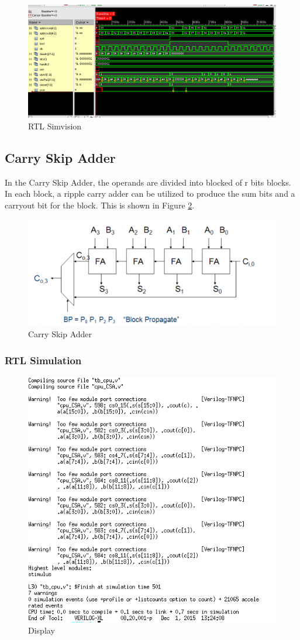 \documentclass[12pt]{article}
\begin{document}
\begin{figure}[H]
\centering
\includegraphics[width=\linewidth]{../CLA/test-test}
\caption{RTL Simvision}
\label{fig:test-test}
\end{figure}

\subsection{Carry Skip Adder}
In the Carry Skip Adder, the operands are divided into blocked of r bits blocks. In each block, a ripple carry adder can be utilized to produce the sum bits and a carryout bit for the block. This is shown in Figure \ref{fig:carry-skip}.

\begin{figure}[H]
\centering
\includegraphics[width=0.7\linewidth]{carry-skip}
\caption{Carry Skip Adder}
\label{fig:carry-skip}
\end{figure}

\subsubsection{RTL Simulation}
\begin{figure}[H]
	\centering
	\includegraphics[width=.7\linewidth]{../CSA/RTL-text}
	\caption{Display}
	\label{fig:RTL-text}
\end{figure}
\end{document}
